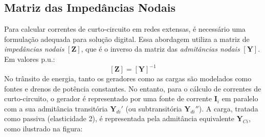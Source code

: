 \subsection{Matriz das Impedâncias Nodais}

Para calcular correntes de curto-circuito em redes extensas, é necessário uma formulação adequada para solução digital. Essa abordagem utiliza a matriz de \textit{impedâncias nodais} $[\mathbf{Z}]$, que é o inverso da matriz das \textit{admitâncias nodais} $[\mathbf{Y}]$. Em valores p.u.:
$$
    [\mathbf{Z}] = [\mathbf{Y}]^{-1}
$$
No trânsito de energia, tanto os geradores como as cargas são modelados como fontes e drenos de potência constantes. No entanto, para o cálculo de correntes de curto-circuito, o gerador é representado por uma fonte de corrente $\mathbf{I}_i$ em paralelo com a sua admitância transitória $\mathbf{Y}_{di}'$ (ou subtransitória $\mathbf{Y}_{di}''$). A carga, tratada como passiva (elasticidade 2), é representada pela admitância equivalente $\mathbf{Y}_{Ci}$, como ilustrado na figura:

